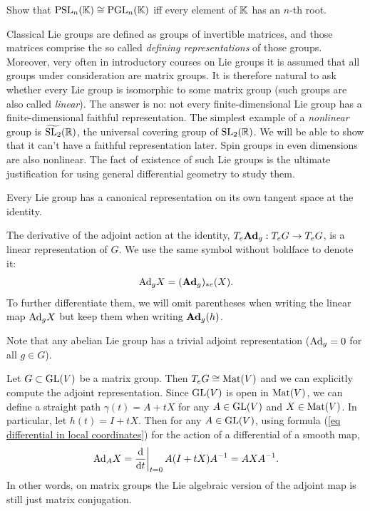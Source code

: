 \begin{xca}\label{xca psl=pgl}
    Show that $\operatorname{PSL}_n(\mathbb{K})\cong \operatorname{PGL}_n(\mathbb{K})$ iff every element of $\mathbb{K}$ has an $n$-th root.
\end{xca}

\begin{rem}
    Classical Lie groups are defined as groups of invertible matrices, and those matrices comprise the so called \emph{defining representations} of those groups. Moreover, very often in introductory courses on Lie groups it is assumed that all groups under consideration are matrix groups. It is therefore natural to ask whether every Lie group is isomorphic to some matrix group (such groups are also called \emph{linear}). The answer is no: not every finite-dimensional Lie group has a finite-dimensional faithful representation. The simplest example of a \emph{nonlinear} group is $\widetilde{\operatorname{SL}_2}(\mathbb{R})$, the universal covering group of $\operatorname{SL}_2(\mathbb{R})$. We will be able to show that it can't have a faithful representation later. Spin groups in even dimensions are also nonlinear. The fact of existence of such Lie groups is the ultimate justification for using general differential geometry to study them.
\end{rem}

Every Lie group has a canonical representation on its own tangent space at the identity.

\begin{defn}
    The derivative of the adjoint action at the identity, $T_e\mathrm{\mathbf{Ad}}_g:T_e G\to T_e G$, is a linear representation of $G$. We use the same symbol without boldface to denote it:
    \[\mathrm{Ad}_g X=(\mathrm{\mathbf{Ad}}_g)_{\ast e}(X).\]
    To further differentiate them, we will omit parentheses when writing the linear map $\mathrm{Ad}_g X$ but keep them when writing $\mathrm{\mathbf{Ad}}_g(h)$.
\end{defn}

    Note that any abelian Lie group has a trivial adjoint representation ($\mathrm{Ad}_g=0$ for all $g\in G$).

\begin{example}
    Let $G\subset \operatorname{GL}(V)$ be a matrix group. Then $T_e G\cong \operatorname{Mat}(V)$ and we can explicitly compute the adjoint representation. Since $\operatorname{GL}(V)$ is open in $\operatorname{Mat}(V)$, we can define a straight path $\gamma(t)=A+tX$ for any $A\in \operatorname{GL}(V)$ and $X\in \operatorname{Mat}(V)$. In particular, let $h(t)=I+tX$. Then for any $A\in \operatorname{GL}(V)$, using formula (\ref{eq differential in local coordinates}) for the action of a differential of a smooth map,
    \[\Ad_A X=\restr{\frac{\dd}{\dd t}}{t=0}A(I+tX)A^{-1}=AXA^{-1}.\]
    In other words, on matrix groups the Lie algebraic version of the adjoint map is still just matrix conjugation.
\end{example}






